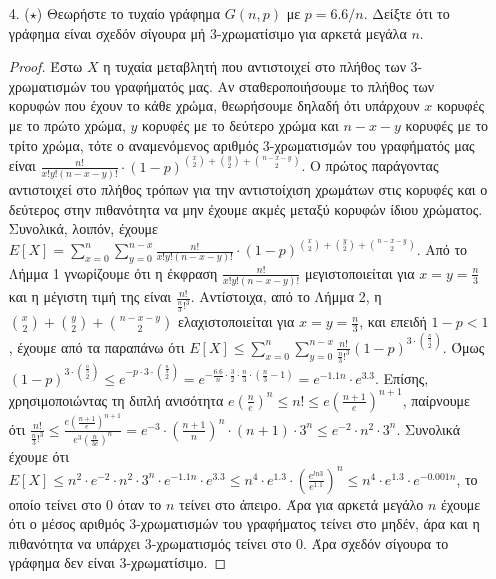 \documentclass[a4paper, oneside, 11pt]{article}
\theoremstyle{definition}
\newcommand{\pr}{\mathbb{P}}
\begin{document}
\begin{enumerate}
\begin{proof}
      Συνεπώς:
      
      \[ \pr[r(v) \geq 10\sqrt{n}] = 1 - \pr[r(v) < 10\sqrt{n}] < 1 -
         \frac{2}{3} = \frac{1}{3} \]
   \end{proof}

\item[4. ($\star$)]
   Θεωρήστε το τυχαίο γράφημα $G(n, p)$ με $p = 6.6/n$. Δείξτε ότι το γράφημα
   είναι σχεδόν σίγουρα μή 3-χρωματίσιμο για αρκετά μεγάλα $n$.

   \begin{proof}
Έστω $X$ η τυχαία μεταβλητή που αντιστοιχεί στο πλήθος των 3-χρωματισμών του γραφήματός μας. Αν σταθεροποιήσουμε το πλήθος των κορυφών που έχουν το κάθε χρώμα, θεωρήσουμε δηλαδή ότι υπάρχουν $x$ κορυφές
με το πρώτο χρώμα, $y$ κορυφές με το δεύτερο χρώμα και $n-x-y$ κορυφές με το τρίτο χρώμα, τότε ο αναμενόμενος αριθμός 3-χρωματισμών του γραφήματός μας είναι $\frac{n!}{x!y!(n-x-y)!} \cdot 
(1-p)^{{x \choose 2} + {y\choose 2} + {n-x-y\choose 2}}$. Ο πρώτος παράγοντας αντιστοιχεί στο πλήθος τρόπων για την αντιστοίχιση χρωμάτων στις κορυφές και ο δεύτερος στην πιθανότητα να μην έχουμε ακμές
μεταξύ κορυφών ίδιου χρώματος. Συνολικά, λοιπόν, έχουμε $E[X] = \sum_{x=0}^{n} \sum_{y=0}^{n-x} \frac{n!}{x!y!(n-x-y)!}\cdot (1-p)^{{x\choose 2}+{y\choose 2}+{n-x-y\choose 2}}$. Από το Λήμμα 1 γνωρίζουμε ότι η έκφραση $\frac{n!}{x!y!(n-x-y)!}$ μεγιστοποιείται για $x=y=\frac{n}{3}$ και η μέγιστη τιμή της είναι $\frac{n!}{\frac{n}{3}!^3}$. Αντίστοιχα, 
από το Λήμμα 2,
η ${{x \choose 2} + {y\choose 2} + {n-x-y\choose 2}}$ 
ελαχιστοποιείται για $x=y=\frac{n}{3}$, και επειδή $1-p<1$, έχουμε από τα παραπάνω ότι $E[X] \leq \sum_{x=0}^{n}\sum_{y=0}^{n-x} \frac{n!}{\frac{n}{3}!^3} (1-p)^{3\cdot {\frac{n}{3}\choose 2}}$.
Όμως $(1-p)^{3\cdot {\frac{n}{3}\choose 2}}\leq e^{-p\cdot {3\cdot {\frac{n}{3}\choose 2}}}=e^{-\frac{6.6}{n}\cdot {\frac{3}{2}\cdot \frac{n}{3}\cdot (\frac{n}{3}-1)}}=e^{-1.1n}\cdot e^{3.3}$.
Επίσης, χρησιμοποιώντας τη διπλή ανισότητα $e(\frac{n}{e})^n \leq n! \leq e(\frac{n+1}{e})^{n+1}$, παίρνουμε ότι $\frac{n!}{\frac{n}{3}!^3}\leq \frac{e(\frac{n+1}{e})^{n+1}}{e^3 (\frac{n}{3e})^n
}=e^{-3} \cdot (\frac{n+1}{n})^n \cdot (n+1) \cdot 3^{n} \leq e^{-2} \cdot n^2 \cdot 3^{n}$. Συνολικά έχουμε ότι $E[X] \leq n^2 \cdot e^{-2} \cdot n^2 \cdot 3^{n}\cdot e^{-1.1n}\cdot e^{3.3}\leq 
n^4 \cdot e^{1.3}\cdot (\frac{e^{ln3}}{e^{1.1}})^n \leq n^4\cdot e^{1.3}\cdot e^{-0.001n}$, το οποίο τείνει στο 0 όταν το $n$ τείνει στο άπειρο. Άρα για αρκετά μεγάλο $n$ έχουμε ότι ο μέσος αριθμός
3-χρωματισμών του γραφήματος τείνει στο μηδέν, άρα και η πιθανότητα να υπάρχει 3-χρωματισμός τείνει στο 0. Άρα σχεδόν σίγουρα το γράφημα δεν είναι 3-χρωματίσιμο.
   \end{proof}


\end{enumerate}
\end{document}
